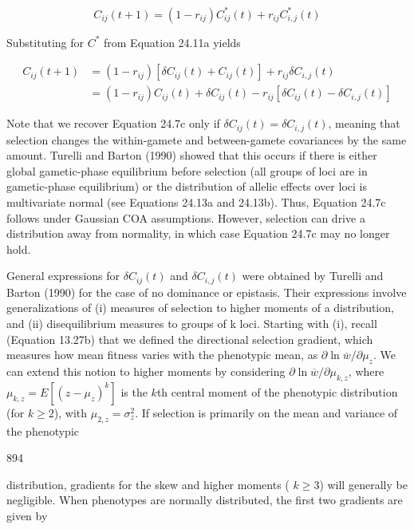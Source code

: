 \documentclass{article}
\begin{document}
\begin{equation}
C_{ij}(t+1)=(1-r_{ij})C_{ij}^{*}(t)+r_{ij}C_{i,j}^{*}(t)
\tag{24.11b}
\label{eq:24_11b}
\end{equation}

Substituting for  $ C^{*} $ from Equation 24.11a yields

\begin{equation}
\begin{aligned}C_{ij}(t+1)&=(1-r_{ij})\left[\delta C_{ij}(t)+C_{ij}(t)\right]+r_{ij}\delta C_{i,j}(t)\\&=(1-r_{ij})C_{ij}(t)+\delta C_{ij}(t)-r_{ij}\left[\delta C_{ij}(t)-\delta C_{i,j}(t)\right]\end{aligned}
\tag{24.11c}
\label{eq:24_11c}
\end{equation}

Note that we recover Equation 24.7c only if  $ \delta C_{ij}(t) = \delta C_{i,j}(t) $, meaning that selection changes the within-gamete and between-gamete covariances by the same amount. Turelli and Barton (1990) showed that this occurs if there is either global gametic-phase equilibrium before selection (all groups of loci are in gametic-phase equilibrium) or the distribution of allelic effects over loci is multivariate normal (see Equations 24.13a and 24.13b). Thus, Equation 24.7c follows under Gaussian COA assumptions. However, selection can drive a distribution away from normality, in which case Equation 24.7c may no longer hold.

General expressions for  $ \delta C_{ij}(t) $ and  $ \delta C_{i,j}(t) $ were obtained by Turelli and Barton (1990) for the case of no dominance or epistasis. Their expressions involve generalizations of (i) measures of selection to higher moments of a distribution, and (ii) disequilibrium measures to groups of k loci. Starting with (i), recall (Equation 13.27b) that we defined the directional selection gradient, which measures how mean fitness varies with the phenotypic mean, as  $ \partial \ln \overline{w} / \partial \mu_z $. We can extend this notion to higher moments by considering  $ \partial \ln \overline{w} / \partial \mu_{k,z} $, where  $ \mu_{k,z} = E[(z - \mu_z)^k] $ is the  $ k $th central moment of the phenotypic distribution (for  $ k \geq 2 $), with  $ \mu_{2,z} = \sigma_z^2 $. If selection is primarily on the mean and variance of the phenotypic

894

distribution, gradients for the skew and higher moments ( $ k \geq 3 $) will generally be negligible. When phenotypes are normally distributed, the first two gradients are given by
\end{document}
